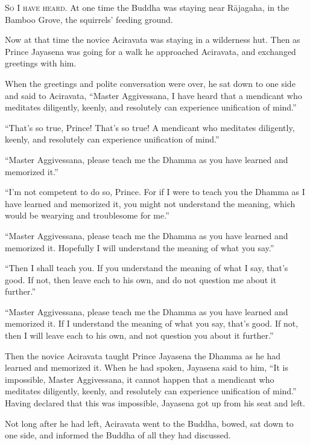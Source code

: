 \documentclass[12pt,openany]{book}%
\newcommand*{\scevam}[1]{\textsc{#1}}
\begin{document}
\scevam{So I have heard. }At one time the Buddha was staying near \textsanskrit{Rājagaha}, in the Bamboo Grove, the squirrels’ feeding ground. 

Now at that time the novice Aciravata was staying in a wilderness hut. Then as Prince Jayasena was going for a walk he approached Aciravata, and exchanged greetings with him. 

When the greetings and polite conversation were over, he sat down to one side and said to Aciravata, “Master Aggivessana, I have heard that a mendicant who meditates diligently, keenly, and resolutely can experience unification of mind.” 

“That’s so true, Prince! That’s so true! A mendicant who meditates diligently, keenly, and resolutely can experience unification of mind.” 

“Master Aggivessana, please teach me the Dhamma as you have learned and memorized it.” 

“I’m not competent to do so, Prince. For if I were to teach you the Dhamma as I have learned and memorized it, you might not understand the meaning, which would be wearying and troublesome for me.” 

“Master Aggivessana, please teach me the Dhamma as you have learned and memorized it. Hopefully I will understand the meaning of what you say.” 

“Then I shall teach you. If you understand the meaning of what I say, that’s good. If not, then leave each to his own, and do not question me about it further.” 

“Master Aggivessana, please teach me the Dhamma as you have learned and memorized it. If I understand the meaning of what you say, that’s good. If not, then I will leave each to his own, and not question you about it further.” 

Then the novice Aciravata taught Prince Jayasena the Dhamma as he had learned and memorized it. When he had spoken, Jayasena said to him, “It is impossible, Master Aggivessana, it cannot happen that a mendicant who meditates diligently, keenly, and resolutely can experience unification of mind.” Having declared that this was impossible, Jayasena got up from his seat and left. 

Not long after he had left, Aciravata went to the Buddha, bowed, sat down to one side, and informed the Buddha of all they had discussed. 
\end{document}
